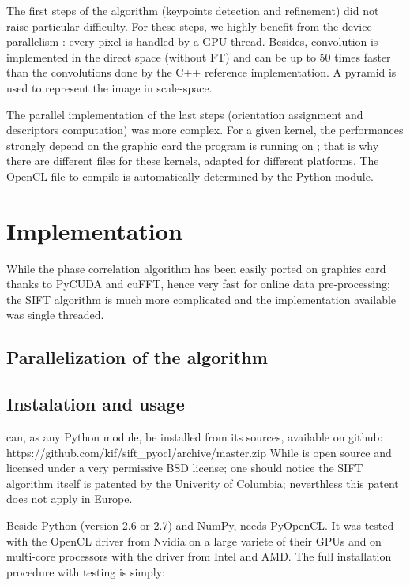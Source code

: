 \documentclass[preprint]{iucr}
\begin{document}
The first steps of the algorithm (keypoints detection and refinement) did not raise particular difficulty. For these steps, we highly benefit from the device parallelism : every pixel is handled by a GPU thread. Besides, convolution is implemented in the direct space (without FT) and can be up to 50 times faster than the convolutions done by the C++ reference implementation. A pyramid is used to represent the image in scale-space\cite{Lowe04}.

The parallel implementation of the last steps (orientation assignment and descriptors computation) was more complex. For a given kernel, the performances strongly depend on the graphic card the program is running on ; that is why there are different files for these kernels, adapted for different platforms. The OpenCL file to compile is automatically determined by the Python module.






\section{Implementation}
While the phase correlation algorithm has been easily ported on graphics card
thanks to PyCUDA and cuFFT, hence very fast for online data
pre-processing;
the SIFT algorithm is much more complicated and the implementation available was
single threaded.

\subsection{Parallelization of the algorithm}



\subsection{Instalation and usage}
 can, as any Python module, be installed from its sources,
available on github:
https://github.com/kif/sift_pyocl/archive/master.zip
While  is open source and licensed under a very
permissive BSD license; one should notice the SIFT algorithm itself is
patented by the Univerity of Columbia\cite{SIFT}; neverthless this patent does
not apply in Europe.

Beside Python (version 2.6 or 2.7) and NumPy,  needs
PyOpenCL\cite{pyopencl}.
It was tested with the OpenCL\cite{opencl} driver from Nvidia on a
large variete of their GPUs and on multi-core processors with the driver from
Intel and AMD. The full installation procedure with testing is simply:
\end{document}
